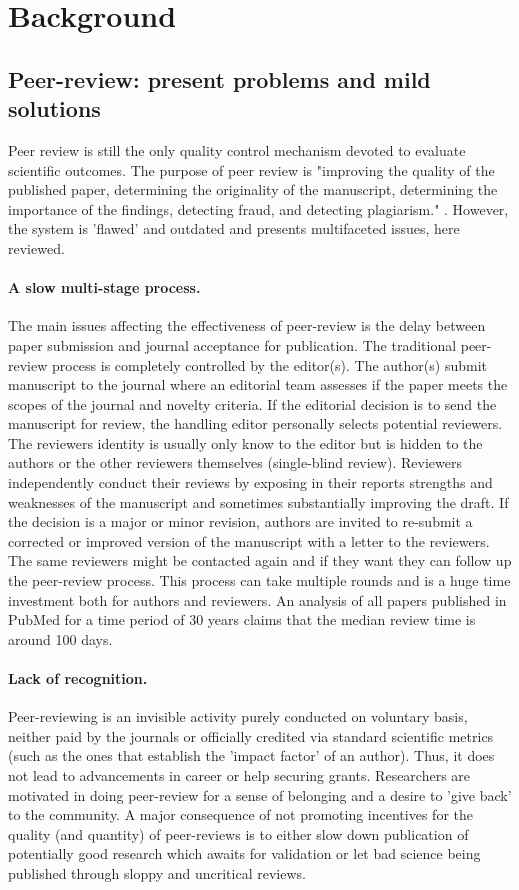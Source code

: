 \documentclass[runningheads]{llncs}
\begin{document}
\section{Background}
\subsection{Peer-review: present problems and mild solutions}
Peer review is still the only quality control mechanism devoted to evaluate scientific outcomes. The purpose of peer review is "improving the quality of the published paper, determining the originality of the manuscript, determining the importance of the findings, detecting fraud, and detecting plagiarism." \cite{Gropp-PeerRevStress}. However, the system is 'ﬂawed' and outdated \cite{Smith2006} and presents multifaceted issues, here reviewed.
\paragraph{A slow multi-stage process.} The main issues affecting the effectiveness of peer-review is the delay between paper submission and journal acceptance for publication. The traditional peer-review process is completely controlled by the editor(s). The author(s) submit manuscript to the journal where an editorial team assesses if the paper meets the scopes of the journal and novelty criteria. If the editorial decision is to send the manuscript for review, the handling editor personally selects potential reviewers. The reviewers identity is usually only know to the editor but is hidden to the authors or the other reviewers themselves (single-blind review). Reviewers independently conduct their reviews by exposing in their reports strengths and weaknesses of the manuscript and sometimes substantially improving the draft. If the decision is a major or minor revision, authors are invited to re-submit a corrected or improved version of the manuscript with a letter to the reviewers. The same reviewers might be contacted again and if they want they can follow up the peer-review process. This process can take multiple rounds and is a huge time investment both for authors and reviewers. An analysis of all papers published in PubMed for a time period of 30 years claims that the median review time is around 100 days\cite{Kendall-peerrev}.
\paragraph{Lack of recognition.} Peer-reviewing is an invisible activity purely conducted on voluntary basis, neither paid by the journals or officially credited via standard scientific metrics (such as the ones that establish the 'impact factor' of an author). Thus, it does not lead to advancements in career or help securing grants. Researchers are motivated in doing peer-review for a sense of belonging and a desire to 'give back' to the community. A major consequence of not promoting incentives for the quality (and quantity) of peer-reviews is to either slow down publication of potentially good research which awaits for validation or let bad science being published through sloppy and uncritical reviews.
\end{document}
